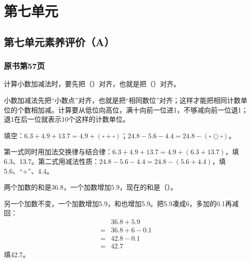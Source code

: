 \chapter{第七单元}


\section{第七单元素养评价（A）}



\subsection*{原书第57页}

计算小数加减法时，要先把（\hspace{1.8em}）对齐，也就是把（\hspace{1.8em}）对齐。\par
\begin{BookAnswer}
小数加减法先把“小数点”对齐，也就是把“相同数位”对齐；这样才能把相同计数单位的个数相加减。计算要从低位向高位，满十向前一位进1，不够减向前一位退1；退1在后一位就表示10个这样的计数单位。
\end{BookAnswer}

填空：\(6.3+4.9+13.7=4.9+(\square+\square)\)；\allowbreak{}\(24.8-5.6-4.4=24.8-(\square\mathbin{\bigcirc}\square)\)。\par
\begin{BookAnswer}
第一式同时用加法交换律与结合律：\(6.3+4.9+13.7=4.9+(6.3+13.7)\)，填6.3、13.7。第二式用减法性质：\(24.8-5.6-4.4=24.8-(5.6+4.4)\)，填5.6、“+”、4.4。
\end{BookAnswer}

两个加数的和是\(36.8\)，一个加数增加\(5.9\)，现在的和是（\hspace{1.8em}）。\par
\begin{BookAnswer}
另一个加数不变，一个加数增加5.9，和也增加5.9。把5.9凑成6，多加的0.1再减回：\[\begin{aligned}&36.8+5.9\\={}&36.8+6-0.1\\={}&42.8-0.1\\={}&42.7\end{aligned}\]填42.7。
\end{BookAnswer}

